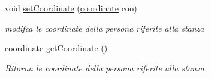 \begin{DoxyCompactItemize}
void \hyperlink{classPersona_a595fabb934aad33a42b33f4d2d2baf91}{set\+Coordinate} (\hyperlink{structcoordinate}{coordinate} coo)
\begin{DoxyCompactList}\small\item\em modifca le coordinate della persona riferite alla stanza \end{DoxyCompactList}\item 
\hypertarget{classPersona_a37f9b4d937362f9d12dc90c56004315c}{}\hyperlink{structcoordinate}{coordinate} \hyperlink{classPersona_a37f9b4d937362f9d12dc90c56004315c}{get\+Coordinate} ()\label{classPersona_a37f9b4d937362f9d12dc90c56004315c}

\begin{DoxyCompactList}\small\item\em Ritorna le coordinate della persona riferite alla stanza. \end{DoxyCompactList}\end{DoxyCompactItemize}
